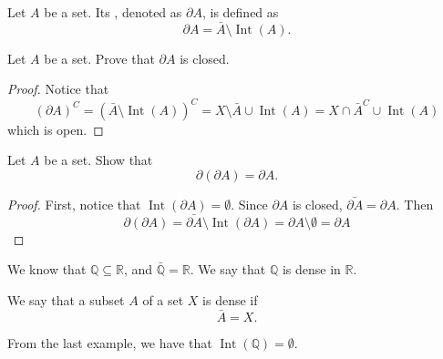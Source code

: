 \documentclass[notoc,notitlepage]{tufte-book}
\DeclareMathOperator{\Int}{Int}
\begin{document}
\begin{defn}\label{defn:boundary_of_a_set}
  Let $A$ be a set. Its ,
  denoted as $\partial A$, is defined as
  \begin{equation*}
    \partial A = \bar{A} \setminus \Int(A).
  \end{equation*}
\end{defn}

\begin{ex}
  Let $A$ be a set. Prove that $\partial A$ is closed.
\end{ex}

\begin{proof}
  Notice that
  \begin{equation*}
    ( \partial A )^C = ( \bar{A} \setminus \Int(A) )^C = X \setminus \bar{A} \cup \Int(A) = X \cap \bar{A}^C \cup \Int(A)
  \end{equation*}
  which is open.
\end{proof}

\begin{ex}
  Let $A$ be a set. Show that
  \begin{equation*}
    \partial ( \partial A ) = \partial A.
  \end{equation*}
\end{ex}

\begin{proof}
  First, notice that $\Int(\partial A) = \emptyset$.
  Since $\partial A$ is closed, $\bar{\partial A} = \partial A$.
  Then
  \begin{equation*}
    \partial ( \partial A ) = \bar{\partial A} \setminus \Int(\partial A)
      = \partial A \setminus \emptyset = \partial A
  \end{equation*}
\end{proof}

\begin{eg}
  We know that $\mathbb{Q} \subseteq \mathbb{R}$,
  and $\bar{\mathbb{Q}} = \mathbb{R}$.
  We say that $\mathbb{Q}$ is dense in $\mathbb{R}$.
\end{eg}

\begin{defn}[Dense]\label{defn:dense}
  We say that a subset $A$ of a set $X$ is dense if
  \begin{equation*}
    \bar{A} = X.
  \end{equation*}
\end{defn}

\begin{eg}
  From the last example, we have that $\Int(\mathbb{Q}) = \emptyset$.
\end{eg}
\end{document}
